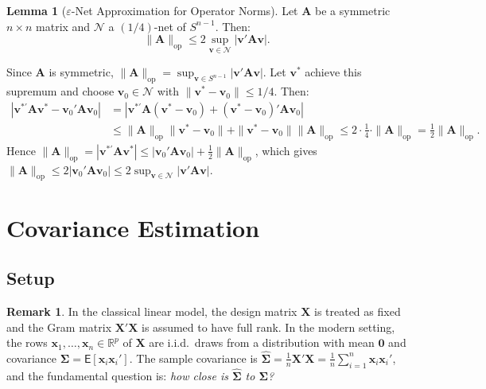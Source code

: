 \documentclass[12pt,a4paper]{article}
\makeatletter
\theoremstyle{definition}
\newtheorem{lemma}[theorem]{Lemma}
\newtheorem{remark}[theorem]{Remark}
\renewenvironment{proof}[1][\proofname]{\par
  \pushQED{\qed}%
  \normalfont \topsep6\p@\@plus6\p@\relax
  \trivlist
  \item[\hskip\labelsep\bfseries #1\@addpunct{.}]\ignorespaces
}{%
  \popQED\endtrivlist\@endpefalse
}
\newcommand\expc{\mathsf{E}}
\newcommand{\bX}{\mathbf{X}}
\newcommand{\bx}{\mathbf{x}}
\newcommand{\bzero}{\mathbf{0}}
\newcommand{\bA}{\mathbf{A}}
\newcommand{\bv}{\mathbf{v}}
\newcommand{\Real}{\mathbb{R}}
\newcommand{\calN}{\mathcal{N}}
\newcommand{\bSigma}{\boldsymbol{\Sigma}}
\newcommand{\hbSigma}{\hat{\boldsymbol{\Sigma}}}
\newcommand{\opnorm}[1]{\|#1\|_{\mathrm{op}}}
\makeatother
\begin{document}
\begin{lemma}[$\varepsilon$-Net Approximation for Operator Norms]\label{lem:eps-net-approx}
Let $\bA$ be a symmetric $n \times n$ matrix and $\calN$ a $(1/4)$-net of $S^{n-1}$. Then:
\begin{equation}\label{eq:eps-net-approx}
\opnorm{\bA} \leqslant 2\sup_{\bv \in \calN} |\bv'\bA\bv|.
\end{equation}
\end{lemma}

\begin{proof}
Since $\bA$ is symmetric, $\opnorm{\bA} = \sup_{\bv \in S^{n-1}} |\bv'\bA\bv|$. Let $\bv^*$ achieve this supremum and choose $\bv_0 \in \calN$ with $\|\bv^* - \bv_0\| \leqslant 1/4$. Then:
\begin{align*}
|\bv^{*\prime}\bA\bv^* - \bv_0'\bA\bv_0| &= |\bv^{*\prime}\bA(\bv^* - \bv_0) + (\bv^* - \bv_0)'\bA\bv_0|\\
&\leqslant \opnorm{\bA}\|\bv^* - \bv_0\| + \|\bv^* - \bv_0\|\opnorm{\bA} \leqslant 2\cdot\frac{1}{4}\cdot\opnorm{\bA} = \frac{1}{2}\opnorm{\bA}.
\end{align*}
Hence $\opnorm{\bA} = |\bv^{*\prime}\bA\bv^*| \leqslant |\bv_0'\bA\bv_0| + \frac{1}{2}\opnorm{\bA}$, which gives $\opnorm{\bA} \leqslant 2|\bv_0'\bA\bv_0| \leqslant 2\sup_{\bv \in \calN}|\bv'\bA\bv|$.
\end{proof}

\section{Covariance Estimation}\label{sec:covariance}

\subsection{Setup}

\begin{remark}
In the classical linear model, the design matrix $\bX$ is treated as fixed and the Gram matrix $\bX'\bX$ is assumed to have full rank. In the modern setting, the rows $\bx_1, \ldots, \bx_n \in \Real^p$ of $\bX$ are i.i.d.\ draws from a distribution with mean $\bzero$ and covariance $\bSigma = \expc[\bx_i\bx_i']$. The sample covariance is $\hbSigma = \frac{1}{n}\bX'\bX = \frac{1}{n}\sum_{i=1}^n \bx_i\bx_i'$, and the fundamental question is: \emph{how close is $\hbSigma$ to $\bSigma$?}
\end{remark}
\end{document}
